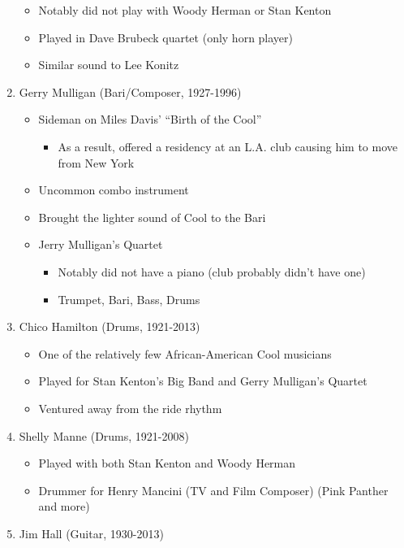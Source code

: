 \documentclass[]{article}
\providecommand{\tightlist}{%
  \setlength{\itemsep}{0pt}\setlength{\parskip}{0pt}}
\begin{document}
\begin{enumerate}
  \begin{itemize}
  \tightlist
  \item
    Notably did not play with Woody Herman or Stan Kenton
  \item
    Played in Dave Brubeck quartet (only horn player)
  \item
    Similar sound to Lee Konitz
  \end{itemize}
\item
  Gerry Mulligan (Bari/Composer, 1927-1996)

  \begin{itemize}
  \tightlist
  \item
    Sideman on Miles Davis' ``Birth of the Cool''

    \begin{itemize}
    \tightlist
    \item
      As a result, offered a residency at an L.A. club causing him to
      move from New York
    \end{itemize}
  \item
    Uncommon combo instrument
  \item
    Brought the lighter sound of Cool to the Bari
  \item
    Jerry Mulligan's Quartet

    \begin{itemize}
    \tightlist
    \item
      Notably did not have a piano (club probably didn't have one)
    \item
      Trumpet, Bari, Bass, Drums
    \end{itemize}
  \end{itemize}
\item
  Chico Hamilton (Drums, 1921-2013)

  \begin{itemize}
  \tightlist
  \item
    One of the relatively few African-American Cool musicians
  \item
    Played for Stan Kenton's Big Band and Gerry Mulligan's Quartet
  \item
    Ventured away from the ride rhythm
  \end{itemize}
\item
  Shelly Manne (Drums, 1921-2008)

  \begin{itemize}
  \tightlist
  \item
    Played with both Stan Kenton and Woody Herman
  \item
    Drummer for Henry Mancini (TV and Film Composer) (Pink Panther and
    more)
  \end{itemize}
\item
  Jim Hall (Guitar, 1930-2013)


\end{enumerate}
\end{document}

